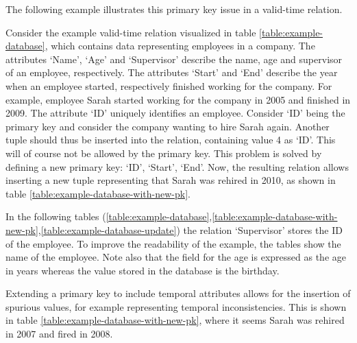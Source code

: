 The following example illustrates this primary key issue in a valid-time relation.

\begin{example}
\label{ex:pk}
Consider the example valid-time relation visualized in table \ref{table:example-database}, which contains data representing employees in a company. The attributes `Name', `Age' and `Supervisor' describe the name, age and supervisor of an employee, respectively.  The attributes `Start' and `End' describe the year when an employee started, respectively finished working for the company. For example, employee Sarah started working for the company in 2005 and finished in 2009. The attribute `ID' uniquely identifies an employee. Consider `ID' being the primary key and consider the company wanting to hire Sarah again. Another tuple should thus be inserted into the relation, containing value 4 as `ID'. This will of course not be allowed by the primary key. This problem is solved by defining a new primary key: `ID', `Start', `End'. Now, the resulting relation allows inserting a new tuple representing that Sarah was rehired in 2010, as shown in table \ref{table:example-database-with-new-pk}.

\end{example}

\begin{note}
In the following tables (\ref{table:example-database},\ref{table:example-database-with-new-pk},\ref{table:example-database-update}) the relation `Supervisor' stores the ID of the employee. To improve the readability of the example, the tables show the name of the employee. Note also that the field for the age is expressed as the age in years whereas the value stored in the database is the birthday.
\end{note}

Extending a primary key to include temporal attributes allows for the insertion of spurious values, for example representing temporal inconsistencies. This is shown in table \ref{table:example-database-with-new-pk}, where it seems Sarah was rehired in 2007 and fired in 2008.

